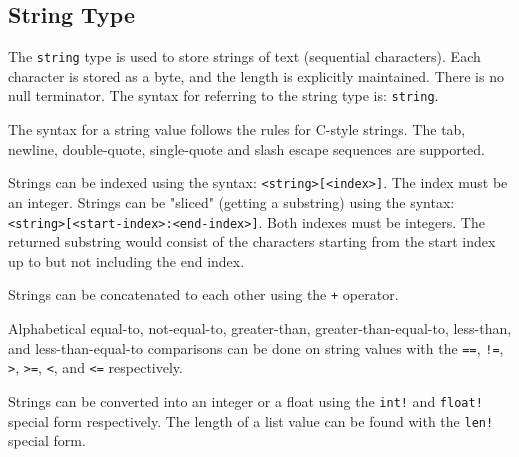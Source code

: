 
\subsection{String Type}
{
	The \texttt{string} type is used to store strings of
	text (sequential characters).
	Each character is stored as a byte, and the length is explicitly
	maintained. There is no null terminator.
	The syntax for referring to the string type is: \texttt{string}.
	
	The syntax for a string value follows the rules for C-style strings.
	The tab, newline, double-quote, single-quote and slash escape sequences
	are supported.
	
	Strings can be indexed using the syntax: \texttt{<string>[<index>]}. The
	index must be an integer.
	Strings can be "sliced" (getting a substring) using
	the syntax: \texttt{<string>[<start-index>:<end-index>]}. Both
	indexes must be integers. The returned substring would consist of
	the characters starting from the start index up to but not including
	the end index.
	
	Strings can be concatenated to each other using the \texttt{+} operator.
	
	Alphabetical equal-to, not-equal-to, greater-than, greater-than-equal-to,
	less-than, and less-than-equal-to
	comparisons can be done on string values with
	the \texttt{==}, \texttt{!=},
	\texttt{>}, \texttt{>=}, \texttt{<}, and \texttt{<=} respectively.
	
	Strings can be converted into
	an integer or a float using
	the \texttt{int!} and \texttt{float!} special form respectively.
	The length of a list value can be found with the \texttt{len!} special form.
}
